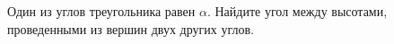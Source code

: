 \begin{ex}
	\begin{condition}
		Один из углов треугольника равен \( \alpha \). Найдите угол между высотами, проведенными из вершин двух других углов.
	\end{condition}
\end{ex}